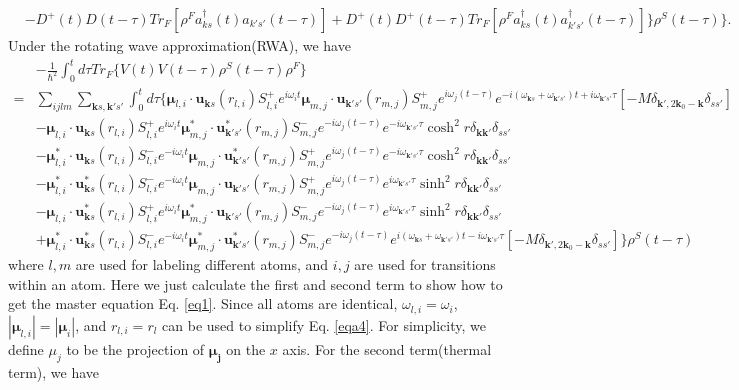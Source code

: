 \documentclass[aps,showpacs,twocolumn,twoside,groupedaddress]{revtex4}
\let\vec\bm
\begin{document}
\begin{widetext}
\begin{equation}
\begin{split}
&-D^{+}(t)D(t-\tau)Tr_{F}[\rho^{F}a^{\dagger}_{ks}(t)a_{k's'}(t-\tau)]+D^{+}(t)D^{+}(t-\tau)Tr_{F}[\rho^{F}a^{\dagger}_{ks}(t)a^{\dagger}_{k's'}(t-\tau)]\}\rho^{S}(t-\tau)\}.
\end{split}
\end{equation}
Under the rotating wave approximation(RWA), we have
\begin{equation}
\label{eqa4}\tag{A5}
\begin{split}
&-\frac{1}{\hbar^{2}}\int_{0}^{t}d\tau Tr_{F}\{V(t)V(t-\tau)\rho^{S}(t-\tau)\rho^{F}\}\\
=&\sum_{ijlm}\underset{\vec{k}s,\vec{k'}s'}{\sum}\int_{0}^{t}d\tau\{\vec{\mu}{}_{l,i}\cdot\vec{u}_{\vec{k}s}(r_{l,i})S_{l,i}^{+}e^{i\omega_{i}t}\vec{\mu}_{m,j}\cdot\vec{u}_{\vec{k}'s'}(r_{m,j})S_{m,j}^{+}e^{i\omega_{j}(t-\tau)}e^{-i(\omega_{\vec{k}s}+\omega_{\vec{k}'s'})t+i\omega_{\vec{k}'s'}\tau}[-M\delta_{\vec{k}',2\vec{k}_{0}-\vec{k}}\delta_{ss'}]\\
&-\vec{\mu}_{l,i}\cdot\vec{u}_{\vec{k}s}(r_{l,i})S_{l,i}^{+}e^{i\omega_{i}t}\vec{\mu}_{m,j}^{*}\cdot\vec{u}_{\vec{k}'s'}^{*}(r_{m,j})S_{m,j}^{-}e^{-i\omega_{j}(t-\tau)}e^{-i\omega_{\vec{k}'s'}\tau}\cosh^{2}r\delta_{\vec{k}\vec{k}'}\delta_{ss'}\\
&-\vec{\mu}_{l,i}^{*}\cdot\vec{u}_{\vec{k}s}(r_{l,i})S_{l,i}^{-}e^{-i\omega_{i}t}\vec{\mu}_{m,j}\cdot\vec{u}_{\vec{k}'s'}^{*}(r_{m,j})S_{m,j}^{+}e^{i\omega_{j}(t-\tau)}e^{-i\omega_{\vec{k}'s'}\tau}\cosh^{2}r\delta_{\vec{k}\vec{k}'}\delta_{ss'}\\
&-\vec{\mu}_{l,i}^{*}\cdot\vec{u}_{\vec{k}s}^{*}(r_{l,i})S_{l,i}^{-}e^{-i\omega_{i}t}\vec{\mu}_{m,j}\cdot\vec{u}_{\vec{k}'s'}(r_{m,j})S_{m,j}^{+}e^{i\omega_{j}(t-\tau)}e^{i\omega_{\vec{k}'s'}\tau}\sinh^{2}r\delta_{\vec{k}\vec{k}'}\delta_{ss'}\\
&-\vec{\mu}_{l,i}\cdot\vec{u}_{\vec{k}s}^{*}(r_{l,i})S_{l,i}^{+}e^{i\omega_{i}t}\vec{\mu}_{m,j}^{*}\cdot\vec{u}_{\vec{k}'s'}(r_{m,j})S_{m,j}^{-}e^{-i\omega_{j}(t-\tau)}e^{i\omega_{\vec{k}'s'}\tau}\sinh^{2}r\delta_{\vec{k}\vec{k}'}\delta_{ss'}\\
&+\vec{\mu}_{l,i}^{*}\cdot\vec{u}_{\vec{k}s}^{*}(r_{l,i})S_{l,i}^{-}e^{-i\omega_{i}t}\vec{\mu}_{m,j}^{*}\cdot\vec{u}_{\vec{k}'s'}^{*}(r_{m,j})S_{m,j}^{-}e^{-i\omega_{j}(t-\tau)}e^{i(\omega_{\vec{k}s}+\omega_{\vec{k}'s'})t-i\omega_{\vec{k}'s'}\tau}[-M\delta_{\vec{k}',2\vec{k}_{0}-\vec{k}}\delta_{ss'}]\}\rho^{S}(t-\tau)
\end{split}
\end{equation}
where $l,m$ are used for labeling different atoms, and $i,j$ are used for transitions within an atom. Here we just calculate the first and second term to show how to get the master equation Eq. \eqref{eq1}. Since all atoms are identical, $\omega_{l,i}=\omega_{i}$, $|\vec\mu_{l,i}|=|\vec\mu_i|$, and $r_{l,i}=r_{l}$ can be used to simplify Eq.  \eqref{eqa4}. For simplicity, we define $\mu_j$ to be the projection of $\vec{\mu_j}$ on the $x$ axis. For the second term(thermal term), we have

\end{widetext}
\end{document}
